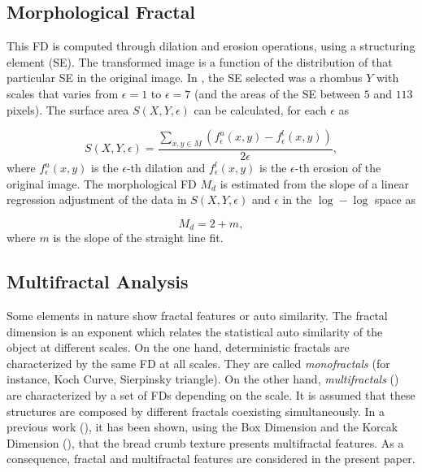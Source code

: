 \documentclass[oneside,a4paper,english,links]{amca}
\begin{document}
\subsection{Morphological Fractal}
This FD is computed through dilation and erosion operations, using a structuring element (SE). The transformed image is a function of the distribution of that particular SE in the original image.  In \cite{Gonzales2008}, the SE selected was a rhombus $Y$ with scales that varies from $\epsilon = 1$ to $\epsilon = 7$ (and the areas of the SE between $5$ and $113$ pixels). The surface area $S(X,Y,\epsilon)$ can be calculated, for each $\epsilon$ as

\begin{equation}
S(X,Y,\epsilon) = \frac{\sum_{x,y \in M} (f_{\epsilon}^{u}(x,y) - f_{\epsilon}^{l}(x,y))}{2\epsilon},
\label{eqn:eqn2}
\end{equation}
\noindent
where $f_{\epsilon}^{u}(x,y)$ is the $\epsilon$-th dilation and $f_{\epsilon}^{l}(x,y)$ is the $\epsilon$-th erosion of the original image. The morphological FD $M_{d}$ is estimated from the slope of a linear regression adjustment of the data in $S(X,Y,\epsilon)$ and $\epsilon$ in the $\log-\log$ space as

\begin{equation}
M_{d} = 2 + m,
\label{eqn:eqn3}
\end{equation}
\noindent
where $m$ is the slope of the straight line fit.

\subsection{Multifractal Analysis}
Some elements in nature show fractal features or auto similarity. The fractal dimension is an exponent which relates the statistical auto similarity of the object at different scales. On the one hand, deterministic fractals are characterized by the same FD at all scales. They are called {\em monofractals} (for instance, Koch Curve, Sierpinsky triangle). On the other hand, {\em multifractals} (\cite{Mandelbrot89}) are characterized by a set of FDs depending on the scale. It is assumed that these structures are composed by different fractals coexisting simultaneously. In a previous work (\cite{Baravalle2012}), it has been shown, using the Box Dimension and the Korcak Dimension (\cite{Imre11}), that the bread crumb texture presents multifractal features. As a consequence, fractal and multifractal features are considered in the present paper.
\end{document}
